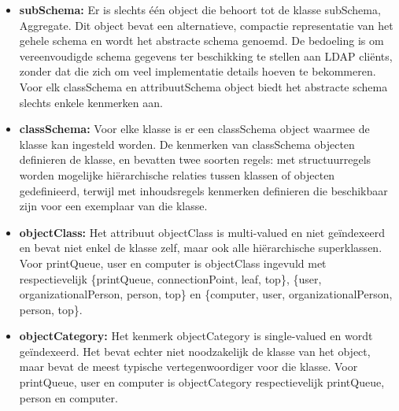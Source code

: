 \documentclass{report}
\begin{document}
\begin{enumerate}
		 {
			\begin{itemize}
				\item \textbf{subSchema:} Er is slechts één object die behoort tot de klasse subSchema, Aggregate. Dit object bevat een alternatieve, compactie representatie van het gehele schema en wordt het abstracte schema genoemd. De bedoeling is om vereenvoudigde schema gegevens ter beschikking te stellen aan LDAP cliënts, zonder dat die zich om veel implementatie details hoeven te bekommeren. Voor elk classSchema en attribuutSchema object biedt het abstracte schema slechts enkele kenmerken aan. 
				\item \textbf{classSchema:} Voor elke klasse is er een classSchema object waarmee de klasse kan ingesteld worden. De kenmerken van classSchema objecten definieren de klasse, en bevatten twee soorten regels: met structuurregels worden mogelijke hiërarchische relaties tussen klassen of objecten gedefinieerd, terwijl met inhoudsregels kenmerken definieren die beschikbaar zijn voor een exemplaar van die klasse.
			\end{itemize}
		}
		
		 { 
			\begin{itemize}
				\item \textbf{objectClass:} Het attribuut objectClass is multi-valued en niet geïndexeerd en bevat niet enkel de klasse zelf, maar ook alle hiërarchische superklassen. Voor printQueue, user en computer is objectClass ingevuld met respectievelijk \{printQueue, connectionPoint, leaf, top\}, \{user, organizationalPerson, person, top\} en \{computer, user, organizationalPerson, person, top\}. 
				\item  \textbf{objectCategory:} Het kenmerk objectCategory is single-valued en wordt geïndexeerd. Het bevat echter niet noodzakelijk de klasse van het object, maar bevat de meest typische vertegenwoordiger voor die klasse. Voor printQueue, user en computer is objectCategory respectievelijk printQueue, person en computer.
			\end{itemize}	
		}
	\end{enumerate}
	
\end{document}
